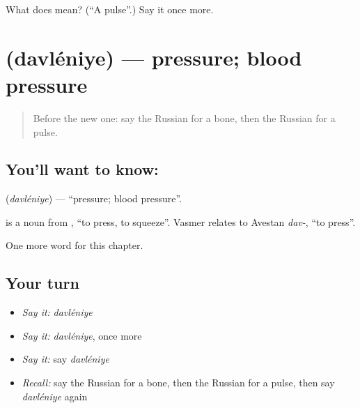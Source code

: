 \begin{tcolorbox}[breakable,colback=teal!4,colframe=teal!35!black,title={Before you move on}]
What does  mean? (\textquotedblleft{}A pulse\textquotedblright{}.) Say it once more.
\end{tcolorbox}
\section[\texorpdfstring{\ru{давление} (davléniye)}{давление (davléniye)}]{ (davléniye) — pressure; blood pressure}

\label{lesson:RU-C211-davleniye}



\begin{quote}
Before the new one: say the Russian for a bone, then the Russian for a pulse.
\end{quote}

\subsection*{You'll want to know: }
\textbf{} (\emph{davléniye}) — \textquotedblleft{}pressure; blood pressure\textquotedblright{}.

\begin{cousinweb}
\textbf{} is a noun from \emph{}, \textquotedblleft{}to press, to squeeze\textquotedblright{}. Vasmer relates \emph{} to Avestan \emph{dav-}, \textquotedblleft{}to press\textquotedblright{}.
\end{cousinweb}

\begin{grammarlens}[title={What you've built}]
One more word for this chapter.
\end{grammarlens}

\subsection*{Your turn}
\begin{itemize}
\raggedright
  \item \emph{Say it:} \emph{davléniye}
  \item \emph{Say it:} \emph{davléniye}, once more
  \item \emph{Say it:} say \emph{davléniye}
  \item \emph{Recall:} say the Russian for a bone, then the Russian for a pulse, then say \emph{davléniye} again
\end{itemize}

